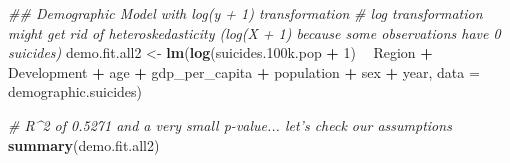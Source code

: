 \documentclass[11pt,]{article}
\newenvironment{Shaded}{\begin{snugshade}}{\end{snugshade}}
\newcommand{\CommentTok}[1]{\textcolor[rgb]{0.56,0.35,0.01}{\textit{#1}}}
\newcommand{\DataTypeTok}[1]{\textcolor[rgb]{0.13,0.29,0.53}{#1}}
\newcommand{\DecValTok}[1]{\textcolor[rgb]{0.00,0.00,0.81}{#1}}
\newcommand{\FloatTok}[1]{\textcolor[rgb]{0.00,0.00,0.81}{#1}}
\newcommand{\KeywordTok}[1]{\textcolor[rgb]{0.13,0.29,0.53}{\textbf{#1}}}
\newcommand{\NormalTok}[1]{#1}
\newcommand{\OperatorTok}[1]{\textcolor[rgb]{0.81,0.36,0.00}{\textbf{#1}}}
\newcommand{\StringTok}[1]{\textcolor[rgb]{0.31,0.60,0.02}{#1}}
\begin{document}
\begin{Shaded}
\begin{Highlighting}[]
\CommentTok{## Demographic Model with log(y + 1) transformation}
\CommentTok{# log transformation might get rid of heteroskedasticity (log(X + 1) because some observations have 0 suicides)}
\NormalTok{demo.fit.all2 <-}\StringTok{ }\KeywordTok{lm}\NormalTok{(}\KeywordTok{log}\NormalTok{(suicides}\FloatTok{.100}\NormalTok{k.pop }\OperatorTok{+}\StringTok{ }\DecValTok{1}\NormalTok{) }\OperatorTok{~}\StringTok{ }\NormalTok{Region }\OperatorTok{+}\StringTok{ }\NormalTok{Development }\OperatorTok{+}\StringTok{ }\NormalTok{age }\OperatorTok{+}\StringTok{ }\NormalTok{gdp_per_capita }\OperatorTok{+}\StringTok{ }\NormalTok{population }\OperatorTok{+}\StringTok{ }\NormalTok{sex }\OperatorTok{+}\StringTok{ }\NormalTok{year, }\DataTypeTok{data =}\NormalTok{ demographic.suicides)}

\CommentTok{# R^2 of 0.5271 and a very small p-value... let's check our assumptions}
\KeywordTok{summary}\NormalTok{(demo.fit.all2)}
\end{Highlighting}
\end{Shaded}
\end{document}

